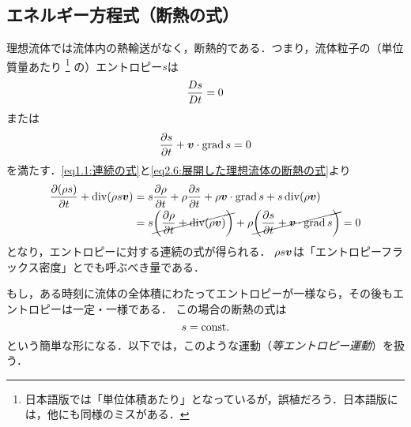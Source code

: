 \subsection*{エネルギー方程式（断熱の式）}
理想流体では流体内の熱輸送がなく，断熱的である．つまり，流体粒子の（単位質量あたり
\footnote{日本語版では「単位体積あたり」となっているが，誤植だろう．日本語版には，他にも同様のミスがある．}
の）エントロピー$s$は
\begin{equation}
    \frac{D s}{D t} = 0
\end{equation}
または
\begin{equation}\label{eq2.6:展開した理想流体の断熱の式}
    \pdv{s}{t} + \vb*{v}\cdot\operatorname{grad} s = 0
\end{equation}
を満たす．\eqref{eq1.1:連続の式}と\eqref{eq2.6:展開した理想流体の断熱の式}より
\begin{align}
    \pdv{(\rho s)}{t} + \Div(\rho s\v) &= s \pdv{\rho}{t} + \rho \pdv{s}{t} + \rho\v\cdot\Grad{s} + s \Div(\rho\v) \notag \\
    &= s \cancel{\pqty{\pdv{\rho}{t} + \Div(\rho\v)}} + \rho \cancel{\pqty{\pdv{s}{t} + \v\cdot\Grad s}} = 0 
\end{align}
となり，エントロピーに対する連続の式が得られる．
$\rho s\vb*{v}$は「エントロピーフラックス密度」とでも呼ぶべき量である．

もし，ある時刻に流体の全体積にわたってエントロピーが一様なら，その後もエントロピーは一定・一様である．
この場合の断熱の式は
\begin{equation}
    s = \mathrm{const.}
\end{equation}
という簡単な形になる．以下では，このような運動（\emph{等エントロピー運動}）を扱う．

